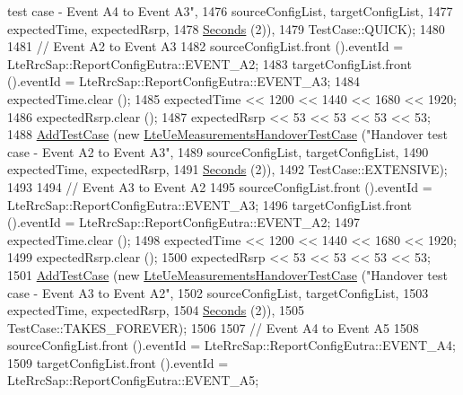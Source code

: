 \begin{DoxyCode}
{       test case - Event A4 to Event A3"},
1476                                                       sourceConfigList, targetConfigList,
1477                                                       expectedTime, expectedRsrp,
1478                                                       \hyperlink{group__timecivil_ga33c34b816f8ff6628e33d5c8e9713b9e}{Seconds} (2)),
1479                TestCase::QUICK);
1480 
1481   \textcolor{comment}{// Event A2 to Event A3}
1482   sourceConfigList.front ().eventId = LteRrcSap::ReportConfigEutra::EVENT\_A2;
1483   targetConfigList.front ().eventId = LteRrcSap::ReportConfigEutra::EVENT\_A3;
1484   expectedTime.clear ();
1485   expectedTime << 1200 << 1440 << 1680 << 1920;
1486   expectedRsrp.clear ();
1487   expectedRsrp << 53 << 53 << 53 << 53;
1488   \hyperlink{classns3_1_1TestCase_a3718088e3eefd5d6454569d2e0ddd835}{AddTestCase} (\textcolor{keyword}{new} \hyperlink{classLteUeMeasurementsHandoverTestCase}{LteUeMeasurementsHandoverTestCase} (\textcolor{stringliteral}{"Handover
       test case - Event A2 to Event A3"},
1489                                                       sourceConfigList, targetConfigList,
1490                                                       expectedTime, expectedRsrp,
1491                                                       \hyperlink{group__timecivil_ga33c34b816f8ff6628e33d5c8e9713b9e}{Seconds} (2)),
1492                TestCase::EXTENSIVE);
1493 
1494   \textcolor{comment}{// Event A3 to Event A2}
1495   sourceConfigList.front ().eventId = LteRrcSap::ReportConfigEutra::EVENT\_A3;
1496   targetConfigList.front ().eventId = LteRrcSap::ReportConfigEutra::EVENT\_A2;
1497   expectedTime.clear ();
1498   expectedTime << 1200 << 1440 << 1680 << 1920;
1499   expectedRsrp.clear ();
1500   expectedRsrp << 53 << 53 << 53 << 53;
1501   \hyperlink{classns3_1_1TestCase_a3718088e3eefd5d6454569d2e0ddd835}{AddTestCase} (\textcolor{keyword}{new} \hyperlink{classLteUeMeasurementsHandoverTestCase}{LteUeMeasurementsHandoverTestCase} (\textcolor{stringliteral}{"Handover
       test case - Event A3 to Event A2"},
1502                                                       sourceConfigList, targetConfigList,
1503                                                       expectedTime, expectedRsrp,
1504                                                       \hyperlink{group__timecivil_ga33c34b816f8ff6628e33d5c8e9713b9e}{Seconds} (2)),
1505                TestCase::TAKES\_FOREVER);
1506 
1507   \textcolor{comment}{// Event A4 to Event A5}
1508   sourceConfigList.front ().eventId = LteRrcSap::ReportConfigEutra::EVENT\_A4;
1509   targetConfigList.front ().eventId = LteRrcSap::ReportConfigEutra::EVENT\_A5;

\end{DoxyCode}
